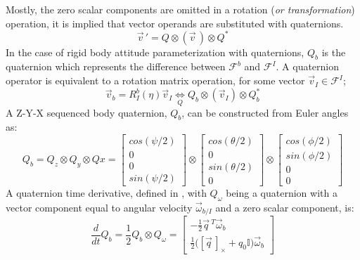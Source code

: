 Mostly, the zero scalar components are omitted in a rotation (\emph{or transformation}) operation, it is implied that vector operands are substituted with quaternions.
\begin{equation}\label{eq:quaternion-rotation}
\vec{v}\hspace{2pt}'=Q \otimes (\vec{v}\hspace{2pt}) \otimes Q^*
\end{equation} 
In the case of rigid body attitude parameterization with quaternions, $Q_b$ is the quaternion which represents the difference between $\mathcal{F}^b$ and $\mathcal{F}^I$. A quaternion operator is equivalent to a rotation matrix operation, for some vector $\vec{v}_I\in\mathcal{F}^I$;
\begin{equation}
\vec{v}_b=R_I^b(\eta)\vec{v}_I \underset{Q}{\iff} Q_b \otimes (\vec{v}_I) \otimes Q_b^*
\end{equation}
A Z-Y-X sequenced body quaternion, $Q_b$, can be constructed from Euler angles as:
\begin{equation}\label{eq:quaternion-sequence}
Q_b=Q_z\otimes Q_y\otimes Qx=\begin{bmatrix}
cos(\psi/2)\\
0\\
0\\
sin(\psi/2)
\end{bmatrix}
\otimes
\begin{bmatrix}
cos(\theta/2)\\
0\\
sin(\theta/2)\\
0
\end{bmatrix}
\otimes
\begin{bmatrix}
cos(\phi/2)\\
sin(\phi/2)\\
0\\
0
\end{bmatrix}
\end{equation}
A quaternion time derivative, defined in \cite{quaterniondynamics}, with $Q_\omega$ being a quaternion with a vector component equal to angular velocity $\vec{\omega}_{b/I}$ and a zero scalar component, is:
\begin{equation}\label{eq:quaternion-deriv}
\frac{d}{dt}Q_b=\frac{1}{2}Q_b\otimes Q_{\omega}=\begin{bmatrix}
-\frac{1}{2}\vec{q}\hspace{2pt}^{T} \vec{\omega}_b\\
\frac{1}{2}\big([\vec{q}\hspace{2pt}]_\times+q_0\mathbb{I}\big)\vec{\omega}_b
\end{bmatrix}
\end{equation}
